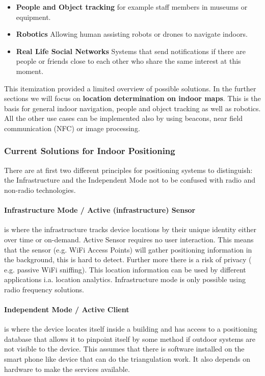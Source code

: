 \begin{itemize}
	\item \textbf{People and Object tracking} for example staff members in museums or equipment.
	\item \textbf{Robotics} Allowing human assisting robots or drones to navigate indoors. 
	\item \textbf{Real Life Social Networks} Systems that send notifications if there are people or friends close to each other who share the same interest at this moment. \parencite{extremetech2014thinkgpsiscool}
\end{itemize}

This itemization provided a limited overview of possible solutions. In the further sections we will focus on \textbf{location determination on indoor maps}. This is the basis for general indoor navigation, people and object tracking as well as robotics. All the other use cases can be implemented also by using beacons, near field communication (NFC) or image processing.  

\subsubsection{Current Solutions for Indoor Positioning}
There are at first two different principles for positioning systems to distinguish: the Infrastructure and the Independent Mode not to be confused with radio and non-radio technologies.

\paragraph{Infrastructure Mode / Active (infrastructure) Sensor} is where the infrastructure tracks device locations by their unique identity either over time or on-demand. Active Sensor requires no user interaction. This means that the sensor (e.g. WiFi Access Points) will gather positioning information in the background, this is hard to detect. Further more there is a risk of privacy ( e.g. passive WiFi sniffing).  This location information can be used by different applications i.a. location analytics. Infrastructure mode is only possible using radio frequency solutions.

\paragraph{Independent Mode / Active Client} is where the device locates itself inside a building and has access to a positioning database that allows it to pinpoint itself by some method if outdoor systems are not visible to the device. This assumes that there is software installed on the smart phone like device that can do the triangulation work. It also depends on hardware to make the services available. 

